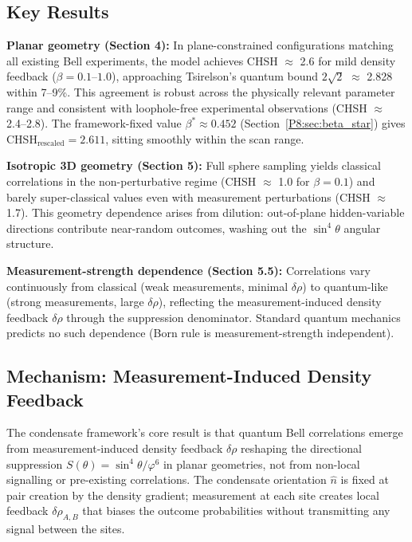 \documentclass[11pt,a4paper]{article}
\theoremstyle{definition}
\theoremstyle{remark}
\newcommand{\vp}{\varphi}
\begin{document}
\subsection{Key Results}

\textbf{Planar geometry (Section 4):} In plane-constrained configurations matching all existing Bell experiments, the model achieves CHSH $\approx$ 2.6 for mild density feedback ($\beta = 0.1$--$1.0$), approaching Tsirelson's quantum bound $2\sqrt{2}$ $\approx$ 2.828 within 7--9\%. This agreement is robust across the physically relevant parameter range and consistent with loophole-free experimental observations (CHSH $\approx$ 2.4--2.8). The framework-fixed value $\beta^* \approx 0.452$ (Section~\ref{P8:sec:beta_star}) gives CHSH$_\mathrm{rescaled} = 2.611$, sitting smoothly within the scan range.

\textbf{Isotropic 3D geometry (Section 5):} Full sphere sampling yields classical correlations in the non-perturbative regime (CHSH $\approx$ 1.0 for $\beta = 0.1$) and barely super-classical values even with measurement perturbations (CHSH $\approx$ 1.7). This geometry dependence arises from dilution: out-of-plane hidden-variable directions contribute near-random outcomes, washing out the $\sin^4\theta$ angular structure.

\textbf{Measurement-strength dependence (Section 5.5):} Correlations vary continuously from classical (weak measurements, minimal $\delta\rho$) to quantum-like (strong measurements, large $\delta\rho$), reflecting the measurement-induced density feedback $\delta\rho$ through the suppression denominator. Standard quantum mechanics predicts no such dependence (Born rule is measurement-strength independent).

\subsection{Mechanism: Measurement-Induced Density Feedback}

The condensate framework's core result is that quantum Bell correlations emerge from measurement-induced density feedback $\delta\rho$ reshaping the directional suppression $S(\theta)=\sin^4\!\theta/\vp^6$ in planar geometries, not from non-local signalling or pre-existing correlations. The condensate orientation $\hat{n}$ is fixed at pair creation by the density gradient; measurement at each site creates local feedback $\delta\rho_{A,B}$ that biases the outcome probabilities without transmitting any signal between the sites.
\end{document}
